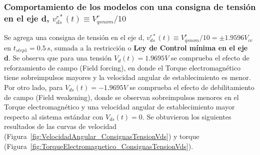\documentclass{article}
\begin{document}
\subsubsection{Comportamiento de los modelos con una consigna de tensión en el eje d, \(v^{r*}_{ds}(t) \equiv V^r_{qs nom}/10\)}

Se agrega una consigna de tensión en el eje d, \(v^{r*}_{ds}(t) \equiv V^r_{qs nom}/10 = \pm 1{.}9596 V_{cc}\) en \(t_{step1} = 0{.}5\, s\), sumada a la restricción o \textbf{Ley de Control mínima en el eje d}. 
Se observa que para una tensión $V_d(t)=1.9695V$ se comprueba el efecto de reforzamiento de campo (Field forcing), en donde el Torque electromagnético tiene sobreimpulsos mayores y la velocidad angular de establecimiento es menor. Por otro lado, para $V_{ds}(t)=-1.9695V$ se comprueba el efecto de debilitamiento de campo (Field weakening), donde se observan sobreimpulsos menores en el Torque electromagnético y una velocidad angular de establecimiento mayor respecto al sistema estándar con $V_{ds}(t)=0$. Se obtuvieron los siguientes resultados de las curvas de velocidad (Figura~\ref{fig:VelocidadAngular_ConsignasTensionVds}) y torque (Figura~\ref{fig:TorqueElectromagnetico_ConsignasTensionVds}).
\end{document}
